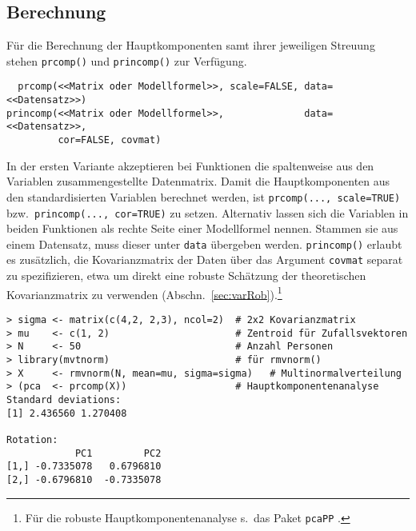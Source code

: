 \subsection{Berechnung}

Für die Berechnung der Hauptkomponenten samt ihrer jeweiligen Streuung stehen \lstinline!prcomp()! und \lstinline!princomp()! zur Verfügung.
\begin{lstlisting}
  prcomp(<<Matrix oder Modellformel>>, scale=FALSE, data=<<Datensatz>>)
princomp(<<Matrix oder Modellformel>>,              data=<<Datensatz>>,
         cor=FALSE, covmat)
\end{lstlisting}

In der ersten Variante akzeptieren bei Funktionen die spaltenweise aus den Variablen zusammengestellte Datenmatrix. Damit die Hauptkomponenten aus den standardisierten Variablen berechnet werden, ist \lstinline!prcomp(..., scale=TRUE)! bzw.\ \lstinline!princomp(..., cor=TRUE)! zu setzen. Alternativ lassen sich die Variablen in beiden Funktionen als rechte Seite einer Modellformel nennen. Stammen sie aus einem Datensatz, muss dieser unter \lstinline!data! übergeben werden. \lstinline!princomp()! erlaubt es zusätzlich, die Kovarianzmatrix der Daten über das Argument \lstinline!covmat! separat zu spezifizieren, etwa um direkt eine  robuste Schätzung der theoretischen Kovarianzmatrix zu verwenden (Abschn.\ \ref{sec:varRob}).\footnote{Für die robuste Hauptkomponentenanalyse s.\ das Paket \lstinline!pcaPP! \cite{Filzmoser2011a}.}
\begin{lstlisting}
> sigma <- matrix(c(4,2, 2,3), ncol=2)  # 2x2 Kovarianzmatrix
> mu    <- c(1, 2)                      # Zentroid für Zufallsvektoren
> N     <- 50                           # Anzahl Personen
> library(mvtnorm)                      # für rmvnorm()
> X     <- rmvnorm(N, mean=mu, sigma=sigma)   # Multinormalverteilung
> (pca  <- prcomp(X))                   # Hauptkomponentenanalyse
Standard deviations:
[1] 2.436560 1.270408

Rotation:
            PC1         PC2
[1,] -0.7335078   0.6796810
[2,] -0.6796810  -0.7335078
\end{lstlisting}

